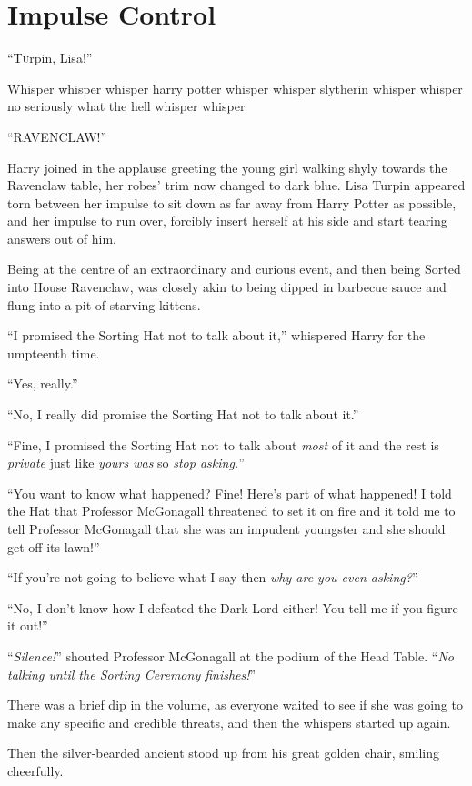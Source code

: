 \chapter{Impulse Control}

\lettrine{“T}urpin, Lisa!”

\quad\quad
Whisper whisper whisper harry potter whisper whisper slytherin whisper whisper no seriously what the hell whisper whisper

“RAVENCLAW!”

Harry joined in the applause greeting the young girl walking shyly towards the Ravenclaw table, her robes’ trim now changed to dark blue. Lisa Turpin appeared torn between her impulse to sit down as far away from Harry Potter as possible, and her impulse to run over, forcibly insert herself at his side and start tearing answers out of him.

Being at the centre of an extraordinary and curious event, and then being Sorted into House Ravenclaw, was closely akin to being dipped in barbecue sauce and flung into a pit of starving kittens.

“I promised the Sorting Hat not to talk about it,” whispered Harry for the umpteenth time.

“Yes, really.”

“No, I really did promise the Sorting Hat not to talk about it.”

“Fine, I promised the Sorting Hat not to talk about \emph{most} of it and the rest is \emph{private} just like \emph{yours was} so \emph{stop asking.}”

“You want to know what happened? Fine! Here’s part of what happened! I told the Hat that Professor McGonagall threatened to set it on fire and it told me to tell Professor McGonagall that she was an impudent youngster and she should get off its lawn!”

“If you’re not going to believe what I say then \emph{why are you even asking?}”

“No, I don’t know how I defeated the Dark Lord either! You tell me if you figure it out!”

“\emph{Silence!}” shouted Professor McGonagall at the podium of the Head Table. “\emph{No talking until the Sorting Ceremony finishes!}”

There was a brief dip in the volume, as everyone waited to see if she was going to make any specific and credible threats, and then the whispers started up again.

Then the silver-bearded ancient stood up from his great golden chair, smiling cheerfully.

